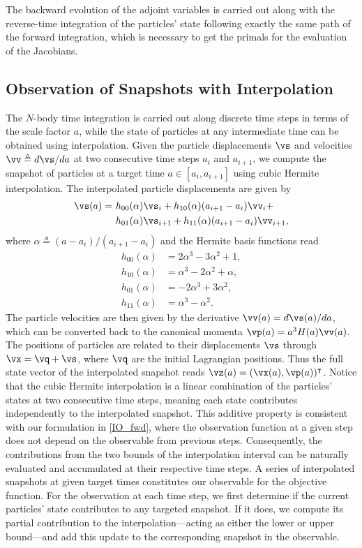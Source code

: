 \documentclass[modern, trackchanges, dvipsnames]{aastex631}
\renewcommand{\d}{d}
\begin{document}
The backward evolution of the adjoint variables is carried out along
with the reverse-time integration of the particles' state following
exactly the same path of the forward integration, which is necessary to
get the primals for the evaluation of the Jacobians.


\vspace{1em}
\subsection{Observation of Snapshots with Interpolation}
\label{sec:snapobs}

The $N$-body time integration is carried out along discrete time steps
in terms of the scale factor $a$, while the state of particles at any
intermediate time can be obtained using interpolation.
Given the particle displacements $\vs$ and velocities $\vv \triangleq
\d\vs/\d a$ at two consecutive time steps $a_i$ and $a_{i+1}$, we compute
the snapshot of particles at a target time $a \in [a_i, a_{i+1}]$ using
cubic Hermite interpolation.
The interpolated particle displacements are given by
\begin{align}
  \vs(a) =\ &h_{00}(\alpha)\vs_i + h_{10}(\alpha)(a_{i+1} - a_i)\vv_i + \nonumber\\
           &h_{01}(\alpha)\vs_{i+1} + h_{11}(\alpha)(a_{i+1} - a_i)\vv_{i+1},
\end{align}
where $\alpha \triangleq (a - a_i)/(a_{i+1} - a_i)$ and the Hermite
basis functions read
\begin{align}
  h_{00}(\alpha) &= 2\alpha^3 - 3\alpha^2 + 1, \nonumber\\
  h_{10}(\alpha) &= \alpha^3 - 2\alpha^2 + \alpha, \nonumber\\
  h_{01}(\alpha) &= -2\alpha^3 + 3\alpha^2, \nonumber\\
  h_{11}(\alpha) &= \alpha^3 - \alpha^2.
\end{align}
The particle velocities are then given by the derivative $\vv(a) =
\d\vs(a) / \d a$, which can be converted back to the canonical momenta
$\vp(a) = a^3 H(a) \vv(a)$.
The positions of particles are related to their displacements $\vs$
through $\vx = \vq + \vs$, where $\vq$ are the initial Lagrangian
positions.
Thus the full state vector of the interpolated snapshot reads
$\vz(a) = (\vx(a), \vp(a))^\intercal$.
Notice that the cubic Hermite interpolation is a linear combination of
the particles' states at two consecutive time steps, meaning each state
contributes independently to the interpolated snapshot.
This additive property is consistent with our formulation in \eqref{IO_fwd},
where the observation function at a given step does not depend on the
observable from previous steps.
Consequently, the contributions from the two bounds of the interpolation
interval can be naturally evaluated and accumulated at their respective time steps.
A series of interpolated snapshots at given target times constitutes our
observable for the objective function.
For the observation at each time step, we first determine if the
current particles' state contributes to any targeted snapshot.
If it does, we compute its partial contribution to the interpolation---acting
as either the lower or upper bound---and add this update to the
corresponding snapshot in the observable.
\end{document}
